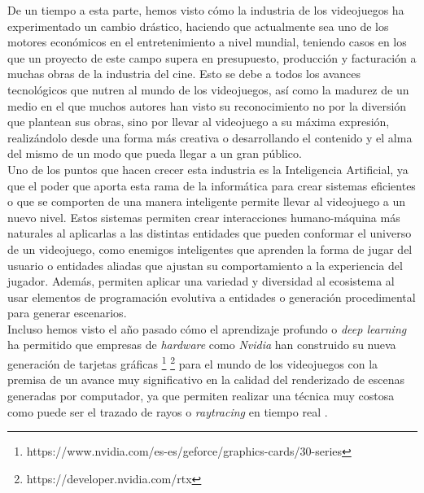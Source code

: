 De un tiempo a esta parte, hemos visto cómo la industria de los videojuegos ha experimentado un cambio drástico, haciendo que actualmente sea uno de los  motores económicos en el entretenimiento a nivel mundial, teniendo casos en los que un proyecto de este campo supera en presupuesto, producción y facturación a muchas obras de la industria del cine. Esto se debe a todos los avances tecnológicos que nutren al mundo de los videojuegos, así como la madurez de un medio en el que muchos autores han visto su reconocimiento no por la diversión que plantean sus obras, sino por llevar al videojuego a su máxima expresión, realizándolo desde una forma más creativa o desarrollando el contenido y el alma del mismo de un modo que pueda llegar a un gran público. \\

Uno de los puntos que hacen crecer esta industria es la Inteligencia Artificial, ya que el poder que aporta esta rama de la informática para crear sistemas eficientes o que se comporten de una manera inteligente permite llevar al videojuego a un nuevo nivel. Estos sistemas permiten crear interacciones humano-máquina más naturales al aplicarlas a las distintas entidades que pueden conformar el universo de un videojuego, como enemigos inteligentes que aprenden la forma de jugar del usuario o entidades aliadas que ajustan su comportamiento a la experiencia del jugador. Además, permiten aplicar una variedad y diversidad al ecosistema al usar elementos de programación evolutiva a entidades \cite{5286468} o generación procedimental \cite{parkin_2016} para generar escenarios. \\

Incluso hemos visto el año pasado cómo el aprendizaje profundo o \textit{deep learning} ha permitido que empresas de \textit{hardware} como \textit{Nvidia} han construido su nueva generación de tarjetas gráficas \footnote{https://www.nvidia.com/es-es/geforce/graphics-cards/30-series} \footnote{https://developer.nvidia.com/rtx} para el mundo de los videojuegos con la premisa de un avance muy significativo en la calidad del renderizado de escenas generadas por computador, ya que permiten realizar una técnica muy costosa como puede ser el trazado de rayos o \textit{raytracing} \cite{Whitted:1980:IIM:358876.358882} en tiempo real \cite{Parker:2013:GRT:2447976.2447997}. \\


